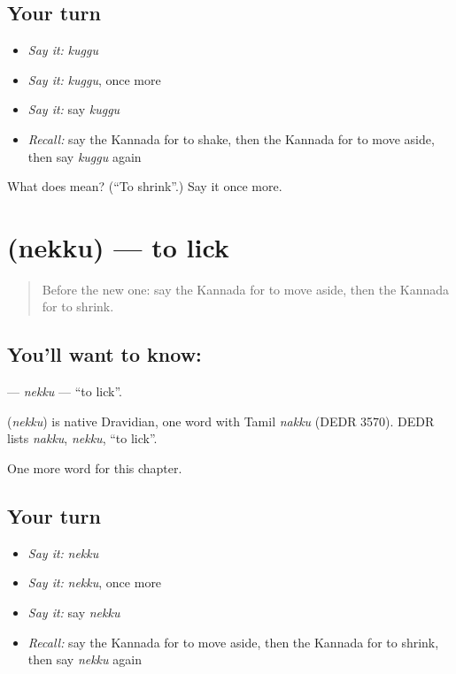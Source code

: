 \subsection*{Your turn}
\begin{itemize}
\raggedright
  \item \emph{Say it:} \emph{kuggu}
  \item \emph{Say it:} \emph{kuggu}, once more
  \item \emph{Say it:} say \emph{kuggu}
  \item \emph{Recall:} say the Kannada for to shake, then the Kannada for to move aside, then say \emph{kuggu} again
\end{itemize}

\begin{tcolorbox}[breakable,colback=teal!4,colframe=teal!35!black,title={Before you move on}]
What does  mean? (\textquotedblleft{}To shrink\textquotedblright{}.) Say it once more.
\end{tcolorbox}
\section[\texorpdfstring{\kn{ನೆಕ್ಕು} (nekku)}{ನೆಕ್ಕು (nekku)}]{ (nekku) — to lick}

\label{lesson:KA-C244-nekku}



\begin{quote}
Before the new one: say the Kannada for to move aside, then the Kannada for to shrink.
\end{quote}

\subsection*{You'll want to know: }
\textbf{} — \emph{nekku} — \textquotedblleft{}to lick\textquotedblright{}.

\begin{cousinweb}
\textbf{} (\emph{nekku}) is native Dravidian, one word with Tamil \emph{nakku} (DEDR 3570). DEDR lists \emph{nakku}, \emph{nekku}, \textquotedblleft{}to lick\textquotedblright{}.
\end{cousinweb}

\begin{grammarlens}[title={What you've built}]
One more word for this chapter.
\end{grammarlens}

\subsection*{Your turn}
\begin{itemize}
\raggedright
  \item \emph{Say it:} \emph{nekku}
  \item \emph{Say it:} \emph{nekku}, once more
  \item \emph{Say it:} say \emph{nekku}
  \item \emph{Recall:} say the Kannada for to move aside, then the Kannada for to shrink, then say \emph{nekku} again
\end{itemize}

